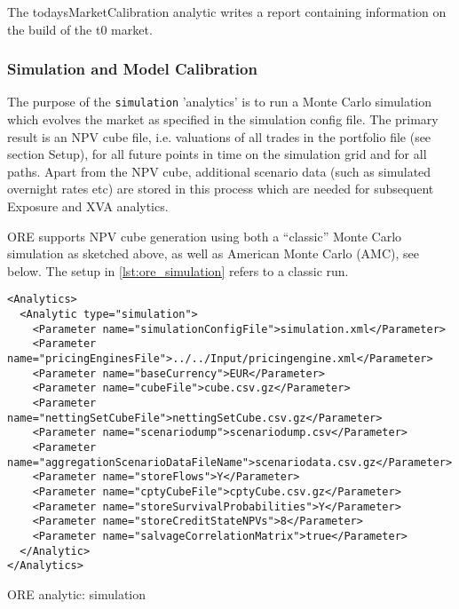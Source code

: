 {The todaysMarketCalibration analytic writes a report containing information on the build of the t0 market.

\subsubsection{Simulation and Model Calibration}

The purpose of the {\tt simulation} 'analytics' is to run a Monte Carlo simulation which evolves the market as
specified in the simulation config file. The primary result is an NPV cube file, i.e. valuations of all trades in the
portfolio file (see section Setup), for all future points in time on the simulation grid and for all paths. Apart from
the NPV cube, additional scenario data (such as simulated overnight rates etc) are stored in this process which are
needed for subsequent Exposure and XVA analytics.

ORE supports NPV cube generation using both a ``classic'' Monte Carlo simulation as sketched above,
as well as American Monte Carlo (AMC), see below. The setup in \ref{lst:ore_simulation} refers to a classic run.

\begin{listing}[H]
\begin{verbatim}
<Analytics>
  <Analytic type="simulation">
    <Parameter name="simulationConfigFile">simulation.xml</Parameter>
    <Parameter name="pricingEnginesFile">../../Input/pricingengine.xml</Parameter>
    <Parameter name="baseCurrency">EUR</Parameter>
    <Parameter name="cubeFile">cube.csv.gz</Parameter>
    <Parameter name="nettingSetCubeFile">nettingSetCube.csv.gz</Parameter>
    <Parameter name="scenariodump">scenariodump.csv</Parameter>
    <Parameter name="aggregationScenarioDataFileName">scenariodata.csv.gz</Parameter>
    <Parameter name="storeFlows">Y</Parameter>
    <Parameter name="cptyCubeFile">cptyCube.csv.gz</Parameter>
    <Parameter name="storeSurvivalProbabilities">Y</Parameter>
    <Parameter name="storeCreditStateNPVs">8</Parameter>
    <Parameter name="salvageCorrelationMatrix">true</Parameter>
  </Analytic>
</Analytics>      
\end{verbatim}
\caption{ORE analytic: simulation}
\label{lst:ore_simulation}
\end{listing}

}
